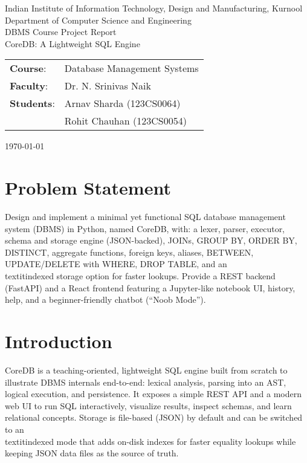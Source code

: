 \documentclass[12pt,a4paper]{article}
\begin{document}
\begin{titlepage}
  \centering
  {\Large Indian Institute of Information Technology, Design and Manufacturing, Kurnool\\}
  {\large Department of Computer Science and Engineering\\[2em]}
  {\LARGE DBMS Course Project Report\\[0.5em]}
  {\Large CoreDB: A Lightweight SQL Engine\\[3em]}

  \begin{tabular}{ll}
    \textbf{Course}: & Database Management Systems \\
    \textbf{Faculty}: & Dr. N. Srinivas Naik \\
    \textbf{Students}: & Arnav Sharda (123CS0064) \\
                       & Rohit Chauhan (123CS0054) \\
  \end{tabular}

  \vfill
  {\large \today}
\end{titlepage}

\tableofcontents
\newpage

\section{Problem Statement}
Design and implement a minimal yet functional SQL database management system (DBMS) in Python, named CoreDB, with: a lexer, parser, executor, schema and storage engine (JSON-backed), JOINs, GROUP BY, ORDER BY, DISTINCT, aggregate functions, foreign keys, aliases, BETWEEN, UPDATE/DELETE with WHERE, DROP TABLE, and an \\textit{indexed} storage option for faster lookups. Provide a REST backend (FastAPI) and a React frontend featuring a Jupyter-like notebook UI, history, help, and a beginner-friendly chatbot (``Noob Mode'').

\section{Introduction}
CoreDB is a teaching-oriented, lightweight SQL engine built from scratch to illustrate DBMS internals end-to-end: lexical analysis, parsing into an AST, logical execution, and persistence. It exposes a simple REST API and a modern web UI to run SQL interactively, visualize results, inspect schemas, and learn relational concepts. Storage is file-based (JSON) by default and can be switched to an \\textit{indexed} mode that adds on-disk indexes for faster equality lookups while keeping JSON data files as the source of truth.
\end{document}
